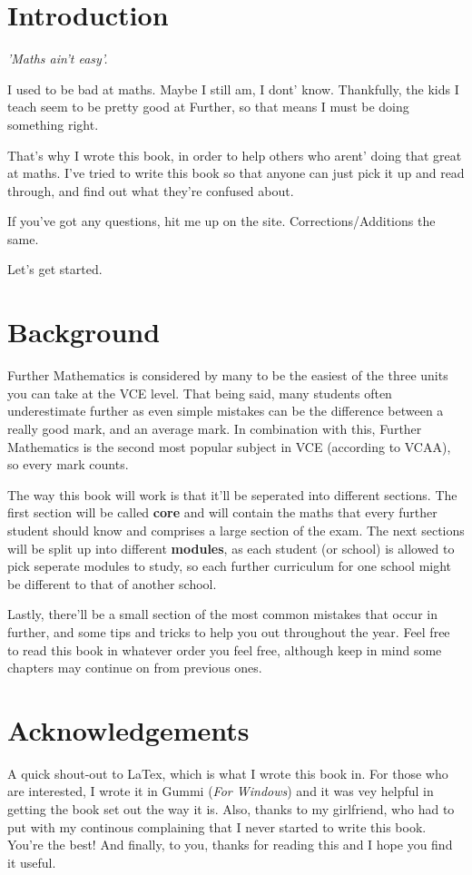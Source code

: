 \documentclass[11pt]{article}
\begin{document}

\section*{Introduction}

\emph{'Maths ain't easy'.}

I used to be bad at maths. Maybe I still am, I dont' know. Thankfully, the kids I teach seem to be pretty good at Further, so that means I must be doing something right.

That's why I wrote this book, in order to help others who arent' doing that great at maths. I've tried to write this book so that anyone can just pick it up and read through, and find out what they're confused about. 

If you've got any questions, hit me up on the site. Corrections/Additions the same.
 
Let's get started.

\section*{Background}
Further Mathematics is considered by many to be the easiest of the three units you can take at the VCE level. That being said, many students often underestimate further as even simple mistakes can be the difference between a really good mark, and an average mark. In combination with this, Further Mathematics is the second most popular subject in VCE (according to VCAA), so every mark counts. 

The way this book will work is that it'll be seperated into different sections. The first section will be called \textbf{core} and will contain the maths that every further student should know and comprises a large section of the exam. The next sections will be split up into different \textbf{modules}, as each student (or school) is allowed to pick seperate modules to study, so each further curriculum for one school might be different to that of another school. 

Lastly, there'll be a small section of the most common mistakes that occur in further, and some tips and tricks to help you out throughout the year. Feel free to read this book in whatever order you feel free, although keep in mind some chapters may continue on from previous ones. 

\section*{Acknowledgements}
A quick shout-out to LaTex, which is what I wrote this book in. For those who are interested, I wrote it in Gummi (\emph{For Windows}) and it was vey helpful in getting the book set out the way it is. Also, thanks to my girlfriend, who had to put with my continous complaining that I never started to write this book. You're the best! And finally, to you, thanks for reading this and I hope you find it useful.
\end{document}
